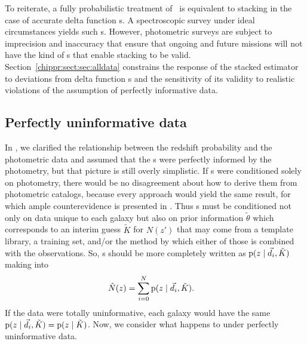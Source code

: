 To reiterate, a fully probabilistic treatment of \Nz\ is equivalent to stacking in the case of accurate delta function \pzpdf s.
A spectroscopic survey under ideal circumstances yields such \pzpdf s.
However, photometric surveys are subject to imprecision and inaccuracy that ensure that ongoing and future missions will not have the kind of \pzpdf s that enable stacking to be valid.
Section~\ref{chippr:sect:sec:alldata} constrains the response of the stacked estimator to deviations from delta function \pzpdf s and the sensitivity of its validity to realistic violations of the assumption of perfectly informative data.

\subsection{Perfectly uninformative data}

In , we clarified the relationship between the redshift probability and the photometric data and assumed that the \pzpdf s were perfectly informed by the photometry, but that picture is still overly simplistic.
If \pzpdf s were conditioned solely on photometry, there would be no disagreement about how to derive them from photometric catalogs, because every approach would yield the same result, for which ample counterevidence is presented in .
Thus \pzpdf s must be conditioned not only on data unique to each galaxy but also on prior information $\tilde{\theta}$ which corresponds to an interim guess $\tilde{K}$ for $N(z')$ that may come from a template library, a training set, and/or the method by which either of those is combined with the observations.
So, \pzpdf s should be more completely written as $\mathrm{p}(z \mid \vec{d}_{i}, \tilde{K})$ making  into
\begin{align}
\eqlabel{eqn:stackwithprior}
\hat{N}(z) &= \sum_{i = 0}^{N} \pr{z \gvn \data_{i}, \tilde{K}} .
\end{align}
If the data were totally uninformative, each galaxy would have the same $\mathrm{p}(z \mid \vec{d}_{i}, \tilde{K}) = \mathrm{p}(z \mid \tilde{K})$.
Now, we consider what happens to  under perfectly uninformative data.

